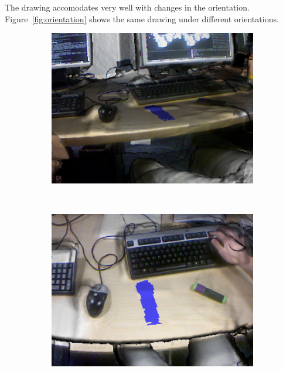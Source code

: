 \documentclass[12pt]{article}
\begin{document}
The drawing accomodates very well with changes in the orientation. Figure~\ref{fig:orientation} shows the same drawing under different orientations.

\begin{figure}[h]
  \centering
  \begin{subfigure}[t]{0.5\textwidth}
    \includegraphics[width=1\textwidth]{Orientation1.png}
    \caption{}
  \end{subfigure}~
  \begin{subfigure}[t]{0.5\textwidth}
    \includegraphics[width=1\textwidth]{Orientation2.png}
    \caption{}
    \end{subfigure}~\\
  \begin{subfigure}[t]{0.5\textwidth}

\end{subfigure}
\end{figure}
\end{document}
